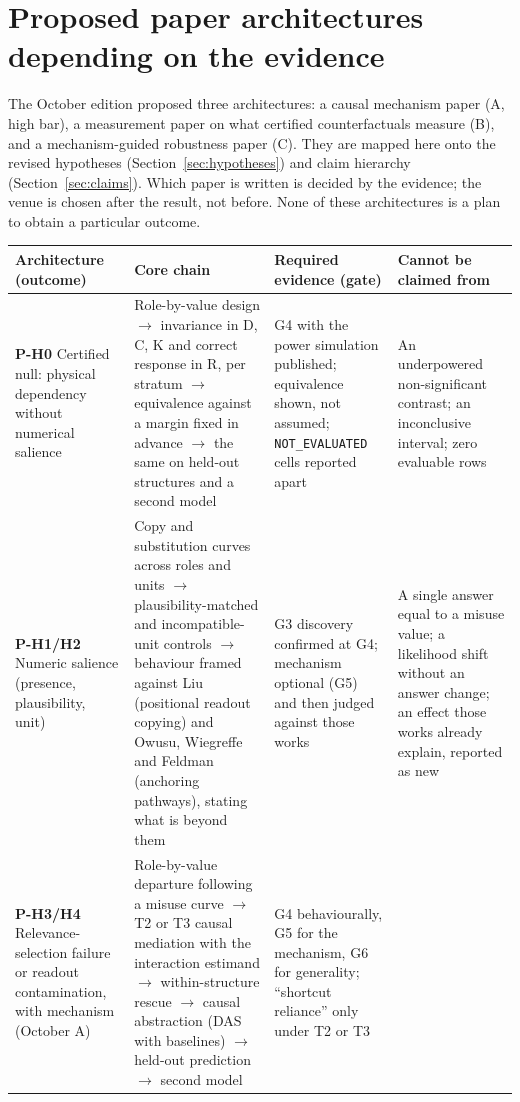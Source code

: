\documentclass[10pt,a4paper]{article}
\newcommand{\NE}{\texttt{NOT\_EVALUATED}}
\begin{document}
\section{Proposed paper architectures depending on the evidence}
\label{sec:papers}

The October edition proposed three architectures: a causal mechanism paper (A, high bar), a measurement paper on
what certified counterfactuals measure (B), and a mechanism-guided robustness paper (C). They are mapped here onto
the revised hypotheses (Section~\ref{sec:hypotheses}) and claim hierarchy (Section~\ref{sec:claims}). Which paper
is written is decided by the evidence; the venue is chosen after the result, not before. None of these
architectures is a plan to obtain a particular outcome.

\begin{center}\small
\begin{tabularx}{\linewidth}{@{}P{3.4cm}LLL@{}}
\toprule
Architecture (outcome) & Core chain & Required evidence (gate) & Cannot be claimed from \\
\midrule
\textbf{P-H0} Certified null: physical dependency without numerical salience &
Role-by-value design $\to$ invariance in D, C, K and correct response in R, per stratum $\to$ equivalence against a
margin fixed in advance $\to$ the same on held-out structures and a second model &
G4 with the power simulation published; equivalence shown, not assumed; \NE{} cells reported apart &
An underpowered non-significant contrast; an inconclusive interval; zero evaluable rows \\
\textbf{P-H1/H2} Numeric salience (presence, plausibility, unit) &
Copy and substitution curves across roles and units $\to$ plausibility-matched and incompatible-unit controls
$\to$ behaviour framed against Liu (positional readout copying) and Owusu, Wiegreffe and Feldman (anchoring
pathways), stating what is beyond them &
G3 discovery confirmed at G4; mechanism optional (G5) and then judged against those works &
A single answer equal to a misuse value; a likelihood shift without an answer change; an effect those works
already explain, reported as new \\
\textbf{P-H3/H4} Relevance-selection failure or readout contamination, with mechanism (October A) &
Role-by-value departure following a misuse curve $\to$ T2 or T3 causal mediation with the interaction estimand
$\to$ within-structure rescue $\to$ causal abstraction (DAS with baselines) $\to$ held-out prediction $\to$ second
model &
G4 behaviourally, G5 for the mechanism, G6 for generality; ``shortcut reliance'' only under T2 or T3 &

\end{tabularx}
\end{center}
\end{document}
